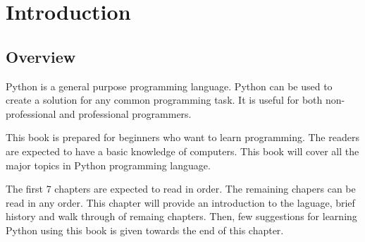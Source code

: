 \cleardoublepage
{}
{}
\chapter*{Introduction}

\section{Overview}
Python is a general purpose programming language.  Python can be used
to create a solution for any common programming task.  It is useful
for both non-professional and professional programmers.

This book is prepared for beginners who want to learn programming.
The readers are expected to have a basic knowledge of computers.  This
book will cover all the major topics in Python programming language.

The first 7 chapters are expected to read in order.  The remaining
chapers can be read in any order.  This chapter will provide an
introduction to the laguage, brief history and walk through of remaing
chapters.  Then, few suggestions for learning Python using this book
is given towards the end of this chapter.
